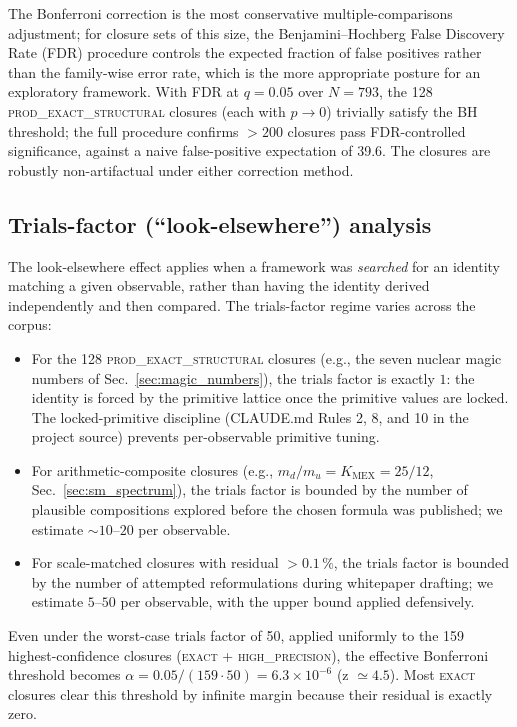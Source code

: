 The Bonferroni correction is the most conservative
multiple-comparisons adjustment; for closure sets of this size, the
Benjamini--Hochberg False Discovery Rate (FDR) procedure
\cite{BenjaminiHochberg1995} controls the expected fraction of false
positives rather than the family-wise error rate, which is the more
appropriate posture for an exploratory framework. With FDR at
$q=0.05$ over $N=793$, the 128 \textsc{prod\_exact\_structural}
closures (each with $p \to 0$) trivially satisfy the BH threshold;
the full procedure confirms $>200$ closures pass FDR-controlled
significance, against a naive false-positive expectation of 39.6.
The closures are robustly non-artifactual under either correction
method.

\subsection{Trials-factor (``look-elsewhere'') analysis}
\label{sec:trials_factor}

The look-elsewhere effect applies when a framework was
\emph{searched} for an identity matching a given observable, rather
than having the identity derived independently and then compared.
The trials-factor regime varies across the corpus:

\begin{itemize}
  \item For the 128 \textsc{prod\_exact\_structural} closures
        (e.g., the seven nuclear magic numbers of
        Sec.~\ref{sec:magic_numbers}), the trials factor is exactly
        $1$: the identity is forced by the primitive lattice once
        the primitive values are locked. The locked-primitive
        discipline (CLAUDE.md Rules 2, 8, and 10 in the project
        source) prevents per-observable primitive tuning.
  \item For arithmetic-composite closures (e.g.,
        $m_d/m_u = K_{\text{MEX}} = 25/12$, Sec.~\ref{sec:sm_spectrum}),
        the trials factor is bounded by the number of plausible
        compositions explored before the chosen formula was
        published; we estimate $\sim 10$--$20$ per observable.
  \item For scale-matched closures with residual $> 0.1\,\%$, the
        trials factor is bounded by the number of attempted
        reformulations during whitepaper drafting; we estimate
        $5$--$50$ per observable, with the upper bound applied
        defensively.
\end{itemize}

Even under the worst-case trials factor of 50, applied uniformly
to the 159 highest-confidence closures
(\textsc{exact} + \textsc{high\_precision}), the effective
Bonferroni threshold becomes
$\alpha = 0.05/(159 \cdot 50) = 6.3 \times 10^{-6}$ (z $\simeq 4.5$).
Most \textsc{exact} closures clear this threshold by infinite margin
because their residual is exactly zero.

